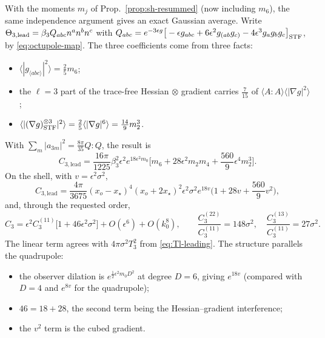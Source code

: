 \documentclass[11pt]{article}
\theoremstyle{definition}
\theoremstyle{remark}
\newcommand{\eps}{\epsilon}
\newcommand{\ens}[1]{\langle #1\rangle}
\begin{document}
With the moments $m_j$ of Prop.~\ref{prop:sh-resummed} (now including $m_6$), the same
independence argument gives an exact Gaussian average. Write $\Theta_{3,\rm lead}=\beta_3Q_{abc}n^an^bn^c$ with
$Q_{abc}=e^{-3\eps g}\big[-\eps g_{abc}+6\eps^2g_{(ab}g_{c)}-4\eps^3g_ag_bg_c\big]_{\rm STF}$, by
\eqref{eq:octupole-map}. The three coefficients come from three facts:
\begin{itemize}
\item $\ens{|g_{\langle abc\rangle}|^2}=\frac25m_6$;
\item the $\ell=3$ part of the trace-free Hessian $\otimes$ gradient carries $\frac7{15}$ of
  $\ens{A{:}A}\ens{|\nabla g|^2}$;
\item $\ens{|(\nabla g)^{\otimes3}_{\rm STF}|^2}=\frac25\ens{|\nabla g|^6}=\frac{14}9m_2^3$.
\end{itemize}
With $\sum_m|a_{3m}|^2=\frac{8\pi}{35}Q{:}Q$, the result is
\begin{equation}\label{eq:octupole-resummed}
\boxed{\displaystyle
C_{3,\mathrm{lead}}=\frac{16\pi}{1225}\beta_3^2\eps^2e^{18\eps^2m_0}
\Big[m_6+28\eps^2m_2m_4+\frac{560}9\eps^4m_2^3\Big].}
\end{equation}
On the shell, with $v=\eps^2\sigma^2$,
\begin{equation}\label{eq:octupole-shell}
\boxed{\displaystyle
C_{3,\mathrm{lead}}=\frac{4\pi}{3675}(x_o-x_\star)^4(x_o+2x_\star)^2\eps^2\sigma^2
e^{18v}\Big(1+28v+\frac{560}9v^2\Big),}
\end{equation}
and, through the requested order,
\[
C_3=\eps^2C_3^{(11)}\big[1+46\eps^2\sigma^2\big]+O(\eps^6)+O(k_0^8),\qquad
\frac{C_3^{(22)}}{C_3^{(11)}}=148\sigma^2,\quad\frac{C_3^{(13)}}{C_3^{(11)}}=27\sigma^2 .
\]
The linear term agrees with $4\pi\sigma^2T_3^2$ from \eqref{eq:Tl-leading}. The structure
parallels the quadrupole:
\begin{itemize}
\item the observer dilation is $e^{\frac12\eps^2m_0D^2}$ at degree $D=6$, giving $e^{18v}$
  (compared with $D=4$ and $e^{8v}$ for the quadrupole);
\item $46=18+28$, the second term being the Hessian--gradient interference;
\item the $v^2$ term is the cubed gradient.
\end{itemize}
\end{document}
